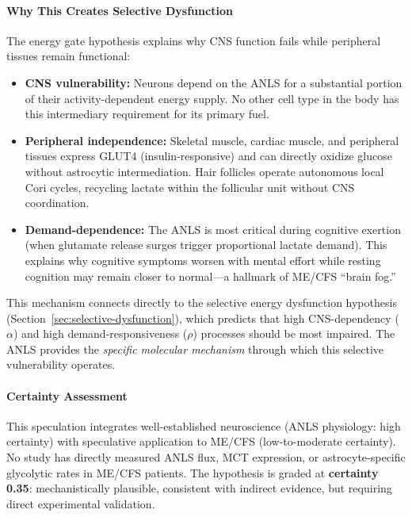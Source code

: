 \begin{speculation}
\paragraph{Why This Creates Selective Dysfunction}

The energy gate hypothesis explains why CNS function fails while peripheral tissues remain functional:

\begin{itemize}
    \item \textbf{CNS vulnerability:} Neurons depend on the ANLS for a substantial portion of their activity-dependent energy supply. No other cell type in the body has this intermediary requirement for its primary fuel.
    \item \textbf{Peripheral independence:} Skeletal muscle, cardiac muscle, and peripheral tissues express GLUT4 (insulin-responsive) and can directly oxidize glucose without astrocytic intermediation. Hair follicles operate autonomous local Cori cycles, recycling lactate within the follicular unit without CNS coordination.
    \item \textbf{Demand-dependence:} The ANLS is most critical during cognitive exertion (when glutamate release surges trigger proportional lactate demand). This explains why cognitive symptoms worsen with mental effort while resting cognition may remain closer to normal---a hallmark of ME/CFS ``brain fog.''
\end{itemize}

This mechanism connects directly to the selective energy dysfunction hypothesis (Section~\ref{sec:selective-dysfunction}), which predicts that high CNS-dependency ($\alpha$) and high demand-responsiveness ($\rho$) processes should be most impaired. The ANLS provides the \emph{specific molecular mechanism} through which this selective vulnerability operates.

\paragraph{Certainty Assessment}

This speculation integrates well-established neuroscience (ANLS physiology: high certainty) with speculative application to ME/CFS (low-to-moderate certainty). No study has directly measured ANLS flux, MCT expression, or astrocyte-specific glycolytic rates in ME/CFS patients. The hypothesis is graded at \textbf{certainty 0.35}: mechanistically plausible, consistent with indirect evidence, but requiring direct experimental validation.
\end{speculation}

